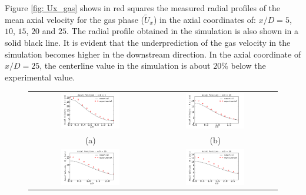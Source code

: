 Figure \ref{fig: Ux_gas} shows in red squares the measured radial profiles of the mean axial velocity for the gas phase ($\tilde{U}_x$) in the axial coordinates of: $x/D=5$, $10$, $15$, $20$ and $25$. The radial profile obtained in the simulation is also shown in a solid black line. It is evident that the underprediction of the gas velocity in the simulation becomes higher in the downstream direction. In the axial coordinate of $x/D=25$, the centerline value in the simulation is about $20\%$ below the experimental value.

\begin{figure}[!htb]
 \centering
\begin{tabular}{cc}
 \includegraphics[width=0.5\textwidth]{./figuras/chap5/Ux/Ux_gas/Ux_gas5.png} & \includegraphics[width=0.5\textwidth]{./figuras/chap5/Ux/Ux_gas/Ux_gas10.png} \\
(a) & (b) \\
\includegraphics[width=0.5\textwidth]{./figuras/chap5/Ux/Ux_gas/Ux_gas15.png} & \includegraphics[width=0.5\textwidth]{./figuras/chap5/Ux/Ux_gas/Ux_gas20.png} \\

\end{tabular}
\end{figure}
